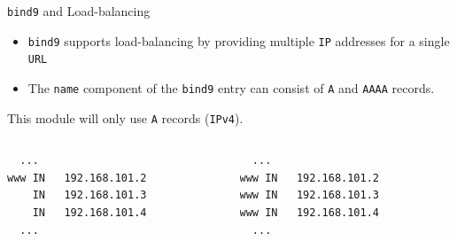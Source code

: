 \documentclass[xcolor=table,aspectratio=169]{beamer}
\begin{document}
\begin{frame}[fragile]{\texttt{bind9} and Load-balancing}
  \begin{itemize}
    \item \texttt{bind9} supports load-balancing by providing multiple \texttt{IP} addresses for a single \texttt{URL}
    \item The \texttt{name} component of the \texttt{bind9} entry can consist of \texttt{A} and \texttt{AAAA} records.
  \end{itemize}
  \begin{tcolorbox}
    \begin{center}
      \scriptsize This module will only use \texttt{A} records (\texttt{IPv4}).
    \end{center}
  \end{tcolorbox}
  \begin{columns}
    \begin{column}{0.5\textwidth}
      \begin{tcolorbox}
        \lstset{
          basicstyle=\scriptsize\ttfamily,
        }
    \begin{lstlisting}
  ...
www IN   192.168.101.2
    IN	 192.168.101.3
    IN	 192.168.101.4
  ...
    \end{lstlisting}
      \end{tcolorbox}
    \end{column}
    \begin{column}{0.5\textwidth}
      \begin{tcolorbox}
        \lstset{
          basicstyle=\scriptsize\ttfamily,
        }
    \begin{lstlisting}
  ...
www IN   192.168.101.2
www IN   192.168.101.3
www IN   192.168.101.4
  ...
    \end{lstlisting}
      \end{tcolorbox}
    \end{column}
  \end{columns}
\end{frame}
\end{document}
